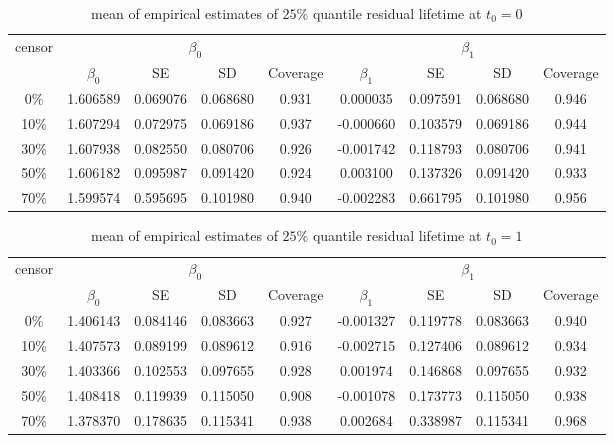 \documentclass[12pt]{article}
\begin{document}
	\begin{table}[hbt!]
		\caption{mean of empirical estimates of $25\%$ quantile residual lifetime at $t_0=0$}
		\centering
		\begin{tabular}{|c|c|c|c|c|c|c|c|c|}
			\hline
			\multirow{2}{*}{censor} & \multicolumn{4}{c|}{$\beta_0$} & \multicolumn{4}{c|}{$\beta_1$}\\ \cline{2-9}
			& $\beta_0$ & SE & SD  & Coverage  & $\beta_1$ & SE & SD & Coverage\\
			\hline\hline
			0\% & 1.606589 & 0.069076 & 0.068680 & 0.931 & 0.000035 & 0.097591 & 0.068680 & 0.946 \\
			10\% & 1.607294 & 0.072975 & 0.069186 & 0.937 & -0.000660 & 0.103579 & 0.069186 & 0.944 \\
			30\% & 1.607938 & 0.082550 & 0.080706 & 0.926 & -0.001742 & 0.118793 & 0.080706 & 0.941 \\
			50\% & 1.606182 & 0.095987 & 0.091420 & 0.924 & 0.003100 & 0.137326 & 0.091420 & 0.933 \\
			70\% & 1.599574 & 0.595695 & 0.101980 & 0.940 & -0.002283 & 0.661795 & 0.101980 & 0.956 \\ 
			\hline
		\end{tabular}
	\end{table}
	\begin{table}[hbt!]
		\caption{mean of empirical estimates of $25\%$ quantile residual lifetime at $t_0=1$}
		\centering
		\begin{tabular}{|c|c|c|c|c|c|c|c|c|}
			\hline
			\multirow{2}{*}{censor} & \multicolumn{4}{c|}{$\beta_0$} & \multicolumn{4}{c|}{$\beta_1$}\\ \cline{2-9}
			& $\beta_0$ & SE & SD  & Coverage  & $\beta_1$ & SE & SD & Coverage\\
			\hline\hline
			0\% & 1.406143 & 0.084146 & 0.083663 & 0.927 & -0.001327 & 0.119778 & 0.083663 & 0.940 \\
			10\% & 1.407573 & 0.089199 & 0.089612 & 0.916 & -0.002715 & 0.127406 & 0.089612 & 0.934 \\
			30\% & 1.403366 & 0.102553 & 0.097655 & 0.928 & 0.001974 & 0.146868 & 0.097655 & 0.932 \\
			50\% & 1.408418 & 0.119939 & 0.115050 & 0.908 & -0.001078 & 0.173773 & 0.115050 & 0.938 \\
			70\% & 1.378370 & 0.178635 & 0.115341 & 0.938 & 0.002684 & 0.338987 & 0.115341 & 0.968 \\
			\hline
		\end{tabular}
	\end{table}
\end{document}
